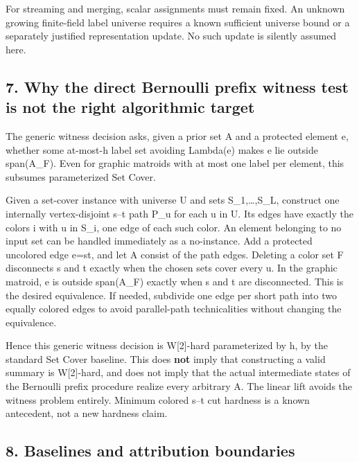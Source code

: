 For streaming and merging, scalar assignments must remain fixed. An unknown growing finite-field label universe requires a known sufficient universe bound or a separately justified representation update. No such update is silently assumed here.

\hypertarget{af-7a1626f5ae-why-the-direct-bernoulli-prefix-witness-test-is-not-the-right-algorithmic-target}{%
\subsection{7. Why the direct Bernoulli prefix witness test is not the right algorithmic target}\label{af-7a1626f5ae-why-the-direct-bernoulli-prefix-witness-test-is-not-the-right-algorithmic-target}}

The generic witness decision asks, given a prior set A and a protected element e, whether some at-most-h label set avoiding Lambda(e) makes e lie outside span(A\_F). Even for graphic matroids with at most one label per element, this subsumes parameterized Set Cover.

Given a set-cover instance with universe U and sets S\_1,\ldots,S\_L, construct one internally vertex-disjoint s--t path P\_u for each u in U. Its edges have exactly the colors i with u in S\_i, one edge of each such color. An element belonging to no input set can be handled immediately as a no-instance. Add a protected uncolored edge e=st, and let A consist of the path edges. Deleting a color set F disconnects s and t exactly when the chosen sets cover every u. In the graphic matroid, e is outside span(A\_F) exactly when s and t are disconnected. This is the desired equivalence. If needed, subdivide one edge per short path into two equally colored edges to avoid parallel-path technicalities without changing the equivalence.

Hence this generic witness decision is W{[}2{]}-hard parameterized by h, by the standard Set Cover baseline. This does \textbf{not} imply that constructing a valid summary is W{[}2{]}-hard, and does not imply that the actual intermediate states of the Bernoulli prefix procedure realize every arbitrary A. The linear lift avoids the witness problem entirely. Minimum colored s--t cut hardness is a known antecedent, not a new hardness claim.

\hypertarget{af-7a1626f5ae-baselines-and-attribution-boundaries}{%
\subsection{8. Baselines and attribution boundaries}\label{af-7a1626f5ae-baselines-and-attribution-boundaries}}


